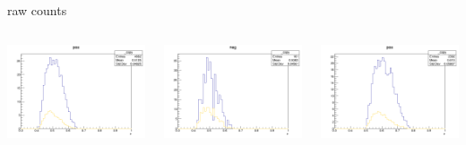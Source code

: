 \begin{frame}{raw counts}
\begin{columns}
\begin{column}[T]{0.25\textwidth}
\includegraphics[width = \textwidth]{results/yield/statistics/yield_x_Q2_z_0.40_4.000_0.50_pos.png}
\end{column}
\begin{column}[T]{0.25\textwidth}
\includegraphics[width = \textwidth]{results/yield/statistics/yield_x_Q2_z_0.40_4.000_0.50_neg.png}
\end{column}
\begin{column}[T]{0.25\textwidth}
\includegraphics[width = \textwidth]{results/yield/statistics/yield_x_Q2_z_0.40_4.000_0.60_pos.png}

\end{column}
\end{columns}
\end{frame}

